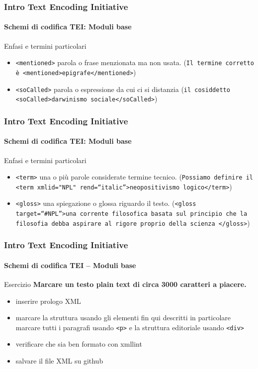 \begin{frame}
	\frametitle{Intro Text Encoding Initiative}
	\framesubtitle{Schemi di codifica TEI: Moduli base}
	\addtocounter{nframe}{1}

    \begin{block}{Enfasi e termini particolari}
        \begin{itemize}
            \item  \texttt{<mentioned>} parola o frase menzionata ma non usata.
            (\texttt{Il termine corretto è <mentioned>epigrafe</mentioned>})
            \item \texttt{<soCalled>} parola o espressione da cui ci si distanzia
            (\texttt{il cosiddetto <soCalled>darwinismo sociale</soCalled>})
        \end{itemize}
    \end{block}
    
\end{frame}

\begin{frame}
	\frametitle{Intro Text Encoding Initiative}
	\framesubtitle{Schemi di codifica TEI: Moduli base}
	\addtocounter{nframe}{1}

    \begin{block}{Enfasi e termini particolari}
        \begin{itemize}
            \item \texttt{<term>} una o più parole considerate termine tecnico.
            (\texttt{Possiamo definire il <term xml\:id="NPL" rend=``italic''>neopositivismo logico</term>})
            \item \texttt{<gloss>} una spiegazione o glossa riguardo il testo.
            (\texttt{<gloss target=``\#NPL''>una corrente filosofica basata
            sul principio che la filosofia debba aspirare al rigore
            proprio della scienza </gloss>})
        \end{itemize}
    \end{block}
    
\end{frame}

\begin{frame}
	\frametitle{Intro Text Encoding Initiative}
	\framesubtitle{Schemi di codifica TEI – Moduli base}
	\addtocounter{nframe}{1}

	\begin{block}{Esercizio}
       \textbf{ Marcare un testo plain text di circa 3000 caratteri a piacere.}
        \begin{itemize}
            \item inserire prologo XML
            \item marcare la struttura usando gli elementi fin qui descritti
            in particolare marcare tutti i paragrafi usando \texttt{<p>} e la struttura editoriale usando \texttt{<div>}
            \item verificare che sia ben formato con xmllint
            \item salvare il file XML su github
        \end{itemize}
    \end{block}
\end{frame}

